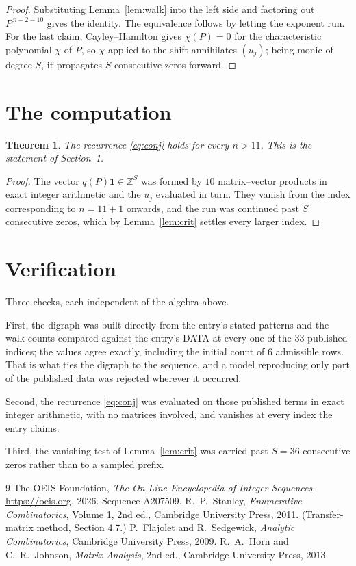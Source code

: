 \documentclass[11pt,a4paper]{article}
\theoremstyle{plain}
\newtheorem{theorem}{Theorem}
\theoremstyle{definition}
\begin{document}
\begin{proof}
Substituting Lemma~\ref{lem:walk} into the left side and factoring out
$P^{\,n-2-10}$ gives the identity. The equivalence follows by letting the exponent
run. For the last claim, Cayley--Hamilton gives $\chi(P)=0$ for the characteristic
polynomial $\chi$ of $P$, so $\chi$ applied to the shift annihilates $(u_j)$; being monic of
degree $S$, it propagates $S$ consecutive zeros forward.
\end{proof}

\section{The computation}

\begin{theorem}
The recurrence \eqref{eq:conj} holds for every $n>11$. This is the statement of
Section~1.
\end{theorem}

\begin{proof}
The vector $q(P)\mathbf{1}\in\mathbb{Z}^{S}$ was formed by $10$ matrix--vector
products in exact integer arithmetic and the $u_j$ evaluated in turn. They vanish from the
index corresponding to $n=11+1$ onwards, and the run was continued past $S$ consecutive
zeros, which by Lemma~\ref{lem:crit} settles every larger index.
\end{proof}

\section{Verification}

Three checks, each independent of the algebra above.

First, the digraph was built directly from the entry's stated patterns and the walk counts
compared against the entry's DATA at every one of the $33$ published indices; the
values agree exactly, including the initial count of $6$ admissible rows. That is
what ties the digraph to the sequence, and a model reproducing only part of the published
data was rejected wherever it occurred.

Second, the recurrence \eqref{eq:conj} was evaluated on those published terms in exact
integer arithmetic, with no matrices involved, and vanishes at every index the entry claims.

Third, the vanishing test of Lemma~\ref{lem:crit} was carried past $S=36$ consecutive
zeros rather than to a sampled prefix.

\begin{thebibliography}{9}
 The OEIS Foundation, \emph{The On-Line Encyclopedia of Integer
Sequences}, \url{https://oeis.org}, 2026. Sequence A207509.
 R.~P.~Stanley, \emph{Enumerative Combinatorics}, Volume 1, 2nd ed.,
Cambridge University Press, 2011. (Transfer-matrix method, Section 4.7.)
 P.~Flajolet and R.~Sedgewick, \emph{Analytic Combinatorics}, Cambridge
University Press, 2009.
 R.~A.~Horn and C.~R.~Johnson, \emph{Matrix Analysis}, 2nd ed., Cambridge
University Press, 2013.
\end{thebibliography}
\end{document}
